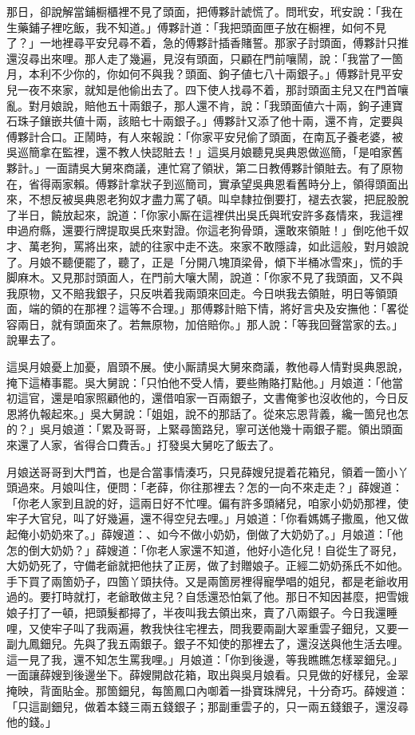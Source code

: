 那日，卻說解當鋪橱櫃裡不見了頭面，把傅夥計諕慌了。問玳安，玳安說：「我在生藥鋪子裡吃飯，我不知道。」傅夥計道：「我把頭面匣子放在橱裡，如何不見了？」一地裡尋平安兒尋不着，急的傅夥計插香賭誓。那家子討頭面，傅夥計只推還沒尋出來哩。那人走了幾遍，見沒有頭面，只顧在門前嚷鬧，說：「我當了一箇月，本利不少你的，你如何不與我？頭面、鉤子値七八十兩銀子。」傅夥計見平安兒一夜不來家，就知是他偷出去了。四下使人找尋不着，那討頭面主兒又在門首嚷亂。對月娘說，賠他五十兩銀子，那人還不肯，說：「我頭面値六十兩，鉤子連寶石珠子鑲嵌共値十兩，該賠七十兩銀子。」傅夥計又添了他十兩，還不肯，定要與傅夥計合口。正鬧時，有人來報說：「你家平安兒偷了頭面，在南瓦子養老婆，被吳巡簡拿在監裡，還不教人快認賍去！」這吳月娘聽見吳典恩做巡簡，「是咱家舊夥計。」一面請吳大舅來商議，連忙寫了領狀，第二日教傅夥計領賍去。有了原物在，省得兩家賴。傅夥計拿狀子到巡簡司，實承望吳典恩看舊時分上，領得頭面出來，不想反被吳典恩老狗奴才盡力罵了頓。叫皁隸拉倒要打，褪去衣裳，把屁股脫了半日，饒放起來，說道：「你家小厮在這裡供出吳氏與玳安許多姦情來，我這裡申過府縣，還要行牌提取吳氏來對證。你這老狗骨頭，還敢來領賍！」{}倒吃他千奴才、萬老狗，罵將出來，諕的往家中走不迭。來家不敢隱諱，如此這般，對月娘說了。月娘不聽便罷了，聽了，正是「分開八塊頂梁骨，傾下半桶冰雪來」，慌的手脚麻木。又見那討頭面人，在門前大嚷大鬧，說道：「你家不見了我頭面，又不與我原物，又不賠我銀子，只反哄着我兩頭來回走。今日哄我去領賍，明日等領頭面，端的領的在那裡？這等不合理。」那傅夥計賠下情，將好言央及安撫他：「畧從容兩日，就有頭面來了。若無原物，加倍賠你。」那人說：「等我回聲當家的去。」說畢去了。

這吳月娘憂上加憂，眉頭不展。使小厮請吳大舅來商議，教他尋人情對吳典恩說，掩下這樁事罷。吳大舅說：「只怕他不受人情，要些賄賂打點他。」月娘道：「他當初這官，還是咱家照顧他的，還借咱家一百兩銀子，文書俺爹也沒收他的，今日反恩將仇報起來。」吳大舅說：「姐姐，說不的那話了。從來忘恩背義，纔一箇兒也怎的？」{}吳月娘道：「累及哥哥，上緊尋箇路兒，寧可送他幾十兩銀子罷。領出頭面來還了人家，省得合口費舌。」打發吳大舅吃了飯去了。

月娘送哥哥到大門首，也是合當事情湊巧，只見薛嫂兒提着花箱兒，領着一箇小丫頭過來。月娘叫住，便問：「老薛，你往那裡去？怎的一向不來走走？」薛嫂道：「你老人家到且說的好，這兩日好不忙哩。偏有許多頭緒兒，咱家小奶奶那裡，使牢子大官兒，叫了好幾遍，還不得空兒去哩。」月娘道：「你看媽媽子撒風，他又做起俺小奶奶來了。」薛嫂道：、如今不做小奶奶，倒做了大奶奶了。」月娘道：「他怎的倒大奶奶？」薛嫂道：「你老人家還不知道，他好小造化兒！自從生了哥兒，大奶奶死了，守備老爺就把他扶了正房，做了封贈娘子。正經二奶奶孫氏不如他。手下買了兩箇奶子，四箇丫頭扶侍。又是兩箇房裡得寵學唱的姐兒，都是老爺收用過的。要打時就打，老爺敢做主兒？自恁還恐怕氣了他。那日不知因甚麼，把雪娥娘子打了一頓，把頭髮都撏了，半夜叫我去領出來，賣了八兩銀子。今日我還睡哩，又使牢子叫了我兩遍，教我快往宅裡去，問我要兩副大翠重雲子鈿兒，又要一副九鳳鈿兒。先與了我五兩銀子。銀子不知使的那裡去了，還沒送與他生活去哩。這一見了我，還不知怎生罵我哩。」月娘道：「你到後邊，等我瞧瞧怎樣翠鈿兒。」一面讓薛嫂到後邊坐下。薛嫂開啟花箱，取出與吳月娘看。只見做的好樣兒，金翠掩映，背面貼金。那箇鈿兒，每箇鳳口內啣着一掛寶珠牌兒，十分奇巧。薛嫂道：「只這副鈿兒，做着本錢三兩五錢銀子；那副重雲子的，只一兩五錢銀子，還沒尋他的錢。」

